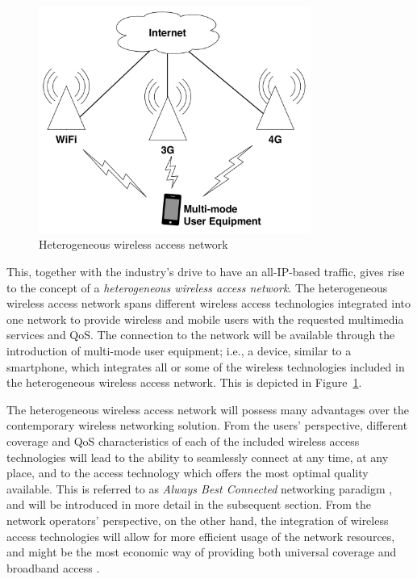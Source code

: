 \begin{figure}[t]
    \centering
    \includegraphics[width=3.5in]{Intelligent/Figures/heterogeneous}
    \caption{Heterogeneous wireless access network}
    \label{fig:heterogeneous_intelligent}
\end{figure}

This, together with the industry's drive to have an all-IP-based traffic, gives rise to the concept of a \emph{heterogeneous wireless access network}. The heterogeneous wireless access network spans different wireless access technologies integrated into one network to provide wireless and mobile users with the requested multimedia services and QoS. The connection to the network will be available through the introduction of multi-mode user equipment; i.e., a device, similar to a smartphone, which integrates all or some of the wireless technologies included in the heterogeneous wireless access network. This is depicted in Figure~\ref{fig:heterogeneous_intelligent}.

The heterogeneous wireless access network will possess many advantages over the contemporary wireless networking solution. From the users' perspective, different coverage and QoS characteristics of each of the included wireless access technologies will lead to the ability to seamlessly connect at any time, at any place, and to the access technology which offers the most optimal quality available. This is referred to as \emph{Always Best Connected} networking paradigm \cite{ABC03}, and will be introduced in more detail in the subsequent section. From the network operators' perspective, on the other hand, the integration of wireless access technologies will allow for more efficient usage of the network resources, and might be the most economic way of providing both universal coverage and broadband access \cite{HossainBeaubrun09}.

